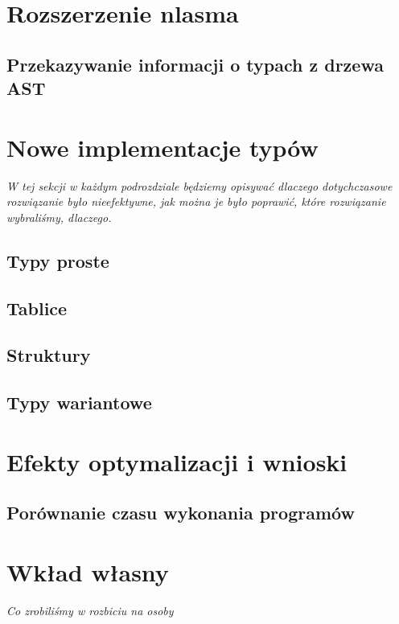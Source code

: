 \documentclass[11pt]{article}
\begin{document}
    \section{Rozszerzenie nlasma}
    \subsection{Przekazywanie informacji o typach z drzewa AST}

    \section{Nowe implementacje typów}
    \emph{W tej sekcji w każdym podrozdziale będziemy opisywać dlaczego
          dotychczasowe rozwiązanie było nieefektywne, jak można je
          było poprawić, które rozwiązanie wybraliśmy, dlaczego.}
    \subsection{Typy proste}
    \subsection{Tablice}
    \subsection{Struktury}
    \subsection{Typy wariantowe}

    \section{Efekty optymalizacji i wnioski}
    \subsection{Porównanie czasu wykonania programów}

    \section{Wkład własny}
    \emph{Co zrobiliśmy w rozbiciu na osoby}
\end{document}
